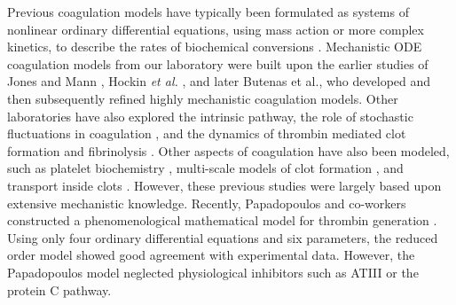 \documentclass[11pt]{article}
\begin{document}
Previous coagulation models have typically been formulated as systems of nonlinear ordinary differential equations,
using mass action or more complex kinetics, to describe the rates of biochemical conversions \citep{Khanin:1989aa,Willems:1991aa,Baldwin:1994aa,Leipold:1995aa,Kuharsky:2001aa}.
Mechanistic ODE coagulation models from our laboratory \citep{Luan:2007aa,Luan:2010aa}
were built upon the earlier studies of Jones and Mann \citep{Jones:1994aa}, Hockin \emph{et al.} \citep{Hockin:2002aa}, and later Butenas et al., \citep{Butenas:2004aa}
who developed and then subsequently refined highly mechanistic coagulation models.
Other laboratories have also explored the intrinsic pathway, the role of stochastic fluctuations in coagulation \citep{Lo:2005aa},
and the dynamics of thrombin mediated clot formation \citep{Chatterjee:2010aa} and fibrinolysis \citep{Mitrophanov:2014aa}.
Other aspects of coagulation have also been modeled, such as platelet biochemistry \citep{Stalker:2013aa},
multi-scale models of clot formation \citep{Leiderman:2014aa, Bannish:2014ab}, and transport inside clots \citep{Voronov:2013aa}.
However, these previous studies were largely based upon extensive mechanistic knowledge.
Recently, Papadopoulos and co-workers constructed a phenomenological mathematical model for thrombin generation \citep{Atkin:2014}.
Using only four ordinary differential equations and six parameters, the reduced order model showed good agreement with experimental data.
However, the Papadopoulos model neglected physiological inhibitors such as ATIII or the protein C pathway.
\end{document}
